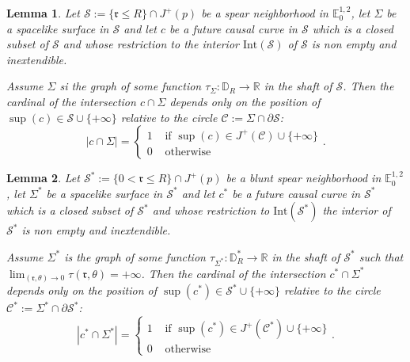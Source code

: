 \documentclass[a4paper,12pt]{article}
\def\r{\mathfrak{r}}
\def\C{\mathcal C}
\def\R{\mathbb{R}}
\def\S{\mathcal S}
\def\S{\mathcal{S}}
\newcommand{\mass}[1]{{\mathbb E}^{1,2}_{#1}}
\newtheorem{lemou}{Lemma}[section]          %
\begin{document}
    \begin{lemou}\label{btzlem:intersect_number_compact}\label{lem:intersect_number_compact}
      Let $\S := \{\r\leq R\}\cap J^+(p)$ be a spear neighborhood in $\mass{0}$, let $\Sigma$ be a spacelike surface in $\S$  and let $c$ be a future causal curve in $\S$ which is a closed subset of $\S$ and whose restriction to the interior  $\mathrm{Int}(\S)$ of $\S$ is non empty and inextendible. 
      
      Assume $\Sigma$ si the graph of some function $\tau_\Sigma:\mathbb D_R\rightarrow \R$ in the shaft of $\S$.
      Then the cardinal of the intersection $c\cap \Sigma$  depends only on the  position of $\sup(c)\in \S\cup\{+\infty\}$ relative to the circle $\C:=\Sigma\cap \partial \S$: 
      $$|c\cap\Sigma|= \left\{ \begin{array}{ll}
                              1 &  \text{ if } \sup(c) \in J^+(\C)\cup\{+\infty\}\\
                              0& \text{ otherwise }
                             \end{array}
\right. .$$

    \end{lemou}
       \begin{lemou}\label{btzlem:intersect_number_complete}\label{lem:intersect_number_complete}
      Let $\S^* := \{0<\r\leq R\}\cap J^+(p)$ be a blunt spear neighborhood in $\mass{0}$, let $\Sigma^*$ be a spacelike surface in $\S^*$  and let $c^*$ be a future causal curve in $\S^*$ which is a closed subset of $\S^*$ and whose restriction to $\mathrm{Int}(\S^*)$ the interior of $\S^*$ is non empty and inextendible. 
      
      Assume $\Sigma^*$ is the graph of some function $\tau_{\Sigma^*}:\mathbb D^*_R\rightarrow \R$ in the shaft of $\S^*$ such that $\lim_{(\r,\theta)\rightarrow 0}\tau(\r,\theta)=+\infty$.
      Then the cardinal of the intersection $c^*\cap \Sigma^*$  depends only on the  position of $\sup(c^*)\in \S^*\cup\{+\infty\}$ relative to the circle $\C^*:=\Sigma^*\cap \partial \S^*$: 
      $$|c^*\cap\Sigma^*|= \left\{ \begin{array}{ll}
                              1 &  \text{ if } \sup(c^*) \in J^+(\C^*)\cup\{+\infty\}\\
                              0& \text{ otherwise }
                             \end{array}
\right. .$$

    \end{lemou}
        
\end{document}
